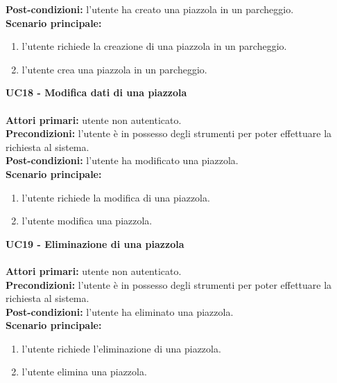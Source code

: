 \textbf{Post-condizioni:} l'utente ha creato una piazzola in un parcheggio.
\\
\textbf{Scenario principale:}
\begin{enumerate}
    \item l'utente richiede la creazione di una piazzola in un parcheggio.
    \item l'utente crea una piazzola in un parcheggio.
\end{enumerate}
\leavevmode\newline
\textbf{UC18 - Modifica dati di una piazzola}
\\\\
\textbf{Attori primari:} utente non autenticato.
\\
\textbf{Precondizioni:} l'utente è in possesso degli strumenti per poter effettuare la richiesta al sistema.
\\
\textbf{Post-condizioni:} l'utente ha modificato una piazzola.
\\
\textbf{Scenario principale:}
\begin{enumerate}
    \item l'utente richiede la modifica di una piazzola.
    \item l'utente modifica una piazzola.
\end{enumerate}
\leavevmode\newline
\textbf{UC19 - Eliminazione di una piazzola}
\\\\
\textbf{Attori primari:} utente non autenticato.
\\
\textbf{Precondizioni:} l'utente è in possesso degli strumenti per poter effettuare la richiesta al sistema.
\\
\textbf{Post-condizioni:} l'utente ha eliminato una piazzola.
\\
\textbf{Scenario principale:}
\begin{enumerate}
    \item l'utente richiede l'eliminazione di una piazzola.
    \item l'utente elimina una piazzola.
\end{enumerate}

